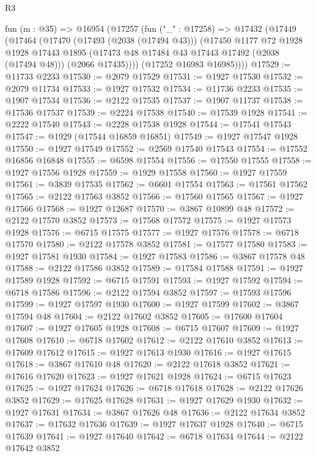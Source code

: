 \begin{lexlean}{R3}
\begin{coremodule}
  fun (m : @35) =>
  @16954
    (@17257
      (fun ("_" : @17258) =>
      @17432
        (@17449
          (@17464
            (@17470
              (@17493 (@2038 (@17494 @43)))
              (@17450
                @1177
                @72
                @1928
                @1928
                @17443
                @1895
                (@17473 @48 @17484 @43 @17443 @17492 (@2038 (@17494 @48)))
                (@2066 @17435))))
          (@17252 @16983 @16985))))
@17529 := @11733 @2233
@17530 := @2079 @17529
@17531 := @1927 @17530
@17532 := @2079 @11734
@17533 := @1927 @17532
@17534 := @11736 @2233
@17535 := @1907 @17534
@17536 := @2122 @17535
@17537 := @1907 @11737
@17538 := @17536 @17537
@17539 := @2224 @17538
@17540 := @17539 @1928
@17541 := @2222 @17540
@17543 := @2228 @17538 @1928
@17544 := @17541 @17543
@17547 := @1929 (@17544 @16859 @16851)
@17549 := @1927 @17547 @1928
@17550 := @1927 @17549
@17552 := @2569 @17540 @17543
@17554 := @17552 @16856 @16848
@17555 := @6598 @17554
@17556 := @17550 @17555
@17558 := @1927 @17556 @1928
@17559 := @1929 @17558
@17560 := @1927 @17559
@17561 := @3839 @17535
@17562 := @6601 @17554
@17563 := @17561 @17562
@17565 := @2122 @17563 @3852
@17566 := @17560 @17565
@17567 := @1927 @17566
@17568 := @1927 @12687
@17570 := @3867 @10899 @48
@17572 := @2122 @17570 @3852
@17573 := @17568 @17572
@17575 := @1927 @17573 @1928
@17576 := @6715 @17575
@17577 := @1927 @17576
@17578 := @6718 @17570
@17580 := @2122 @17578 @3852
@17581 := @17577 @17580
@17583 := @1927 @17581 @1930
@17584 := @1927 @17583
@17586 := @3867 @17578 @48
@17588 := @2122 @17586 @3852
@17589 := @17584 @17588
@17591 := @1927 @17589 @1928
@17592 := @6715 @17591
@17593 := @1927 @17592
@17594 := @6718 @17586
@17596 := @2122 @17594 @3852
@17597 := @17593 @17596
@17599 := @1927 @17597 @1930
@17600 := @1927 @17599
@17602 := @3867 @17594 @48
@17604 := @2122 @17602 @3852
@17605 := @17600 @17604
@17607 := @1927 @17605 @1928
@17608 := @6715 @17607
@17609 := @1927 @17608
@17610 := @6718 @17602
@17612 := @2122 @17610 @3852
@17613 := @17609 @17612
@17615 := @1927 @17613 @1930
@17616 := @1927 @17615
@17618 := @3867 @17610 @48
@17620 := @2122 @17618 @3852
@17621 := @17616 @17620
@17623 := @1927 @17621 @1928
@17624 := @6715 @17623
@17625 := @1927 @17624
@17626 := @6718 @17618
@17628 := @2122 @17626 @3852
@17629 := @17625 @17628
@17631 := @1927 @17629 @1930
@17632 := @1927 @17631
@17634 := @3867 @17626 @48
@17636 := @2122 @17634 @3852
@17637 := @17632 @17636
@17639 := @1927 @17637 @1928
@17640 := @6715 @17639
@17641 := @1927 @17640
@17642 := @6718 @17634
@17644 := @2122 @17642 @3852

\end{coremodule}
\end{lexlean}
